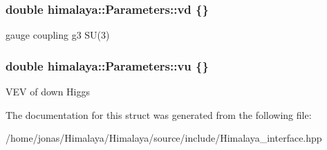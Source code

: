 \subsubsection[{\texorpdfstring{vd}{vd}}]{\setlength{\rightskip}{0pt plus 5cm}double himalaya\+::\+Parameters\+::vd \{\}}\hypertarget{structhimalaya_1_1Parameters_a109a6a905bbc8963010571546dd2f11b}{}\label{structhimalaya_1_1Parameters_a109a6a905bbc8963010571546dd2f11b}
gauge coupling g3 S\+U(3) 
\subsubsection[{\texorpdfstring{vu}{vu}}]{\setlength{\rightskip}{0pt plus 5cm}double himalaya\+::\+Parameters\+::vu \{\}}\hypertarget{structhimalaya_1_1Parameters_aa3c40d7f24703d8fba20e9b23ae95c4d}{}\label{structhimalaya_1_1Parameters_aa3c40d7f24703d8fba20e9b23ae95c4d}
V\+EV of down Higgs 

The documentation for this struct was generated from the following file\+:\begin{DoxyCompactItemize}
\item 
/home/jonas/\+Himalaya/\+Himalaya/source/include/Himalaya\+\_\+interface.\+hpp\end{DoxyCompactItemize}
